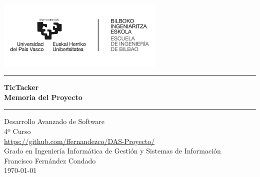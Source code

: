 \begin{titlepage}
\begin{center}
\vspace{2cm}
\includegraphics[width=0.6\textwidth]{root/bie.jpg}~\\[1cm]
\vspace{2cm}

\hrule
\vspace{.5cm}
{ \huge \bfseries TicTacker \\ \vspace{.5cm} Memoria del Proyecto}
\vspace{.5cm}

\hrule
\vspace{1.5cm}


\Large Desarrollo Avanzado de Software\\
\vspace{0.5cm}
\large 4º Curso\\
\vspace{1cm}
\url{https://github.com/ffernandezco/DAS-Proyecto/}\\
\vspace{1cm}
\Large Grado en Ingeniería Informática de Gestión y Sistemas de Información\\
\vspace{1cm}
\large Francisco Fernández Condado\\
\vspace{0.5cm}
\large \today\\

\end{center}
\end{titlepage}